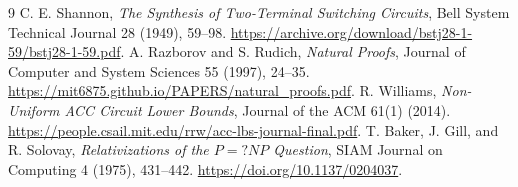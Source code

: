 \documentclass[11pt]{article}
\begin{document}
\begin{thebibliography}{9}
 C. E. Shannon,
\emph{The Synthesis of Two-Terminal Switching Circuits}, Bell System
Technical Journal 28 (1949), 59--98.
\url{https://archive.org/download/bstj28-1-59/bstj28-1-59.pdf}.
 A. Razborov and S. Rudich,
\emph{Natural Proofs}, Journal of Computer and System Sciences 55 (1997),
24--35. \url{https://mit6875.github.io/PAPERS/natural_proofs.pdf}.
 R. Williams,
\emph{Non-Uniform ACC Circuit Lower Bounds}, Journal of the ACM 61(1)
(2014). \url{https://people.csail.mit.edu/rrw/acc-lbs-journal-final.pdf}.
 T. Baker, J. Gill, and R. Solovay,
\emph{Relativizations of the $P=?NP$ Question}, SIAM Journal on Computing
4 (1975), 431--442. \url{https://doi.org/10.1137/0204037}.
\end{thebibliography}

\end{document}
